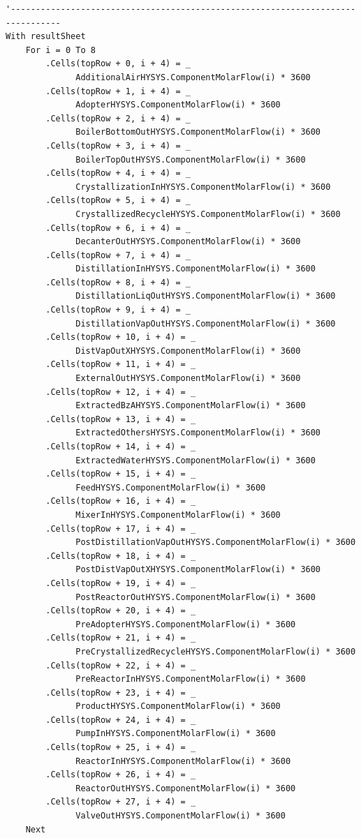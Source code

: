 \documentclass[a4j]{jsreport}
\begin{document}
\begin{lstlisting}[caption=HYSYSとpythonを繋ぐコード]
'--------------------------------------------------------------------------------
With resultSheet
    For i = 0 To 8
        .Cells(topRow + 0, i + 4) = _
              AdditionalAirHYSYS.ComponentMolarFlow(i) * 3600
        .Cells(topRow + 1, i + 4) = _
              AdopterHYSYS.ComponentMolarFlow(i) * 3600
        .Cells(topRow + 2, i + 4) = _
              BoilerBottomOutHYSYS.ComponentMolarFlow(i) * 3600
        .Cells(topRow + 3, i + 4) = _
              BoilerTopOutHYSYS.ComponentMolarFlow(i) * 3600
        .Cells(topRow + 4, i + 4) = _
              CrystallizationInHYSYS.ComponentMolarFlow(i) * 3600
        .Cells(topRow + 5, i + 4) = _
              CrystallizedRecycleHYSYS.ComponentMolarFlow(i) * 3600
        .Cells(topRow + 6, i + 4) = _
              DecanterOutHYSYS.ComponentMolarFlow(i) * 3600
        .Cells(topRow + 7, i + 4) = _
              DistillationInHYSYS.ComponentMolarFlow(i) * 3600
        .Cells(topRow + 8, i + 4) = _
              DistillationLiqOutHYSYS.ComponentMolarFlow(i) * 3600
        .Cells(topRow + 9, i + 4) = _
              DistillationVapOutHYSYS.ComponentMolarFlow(i) * 3600
        .Cells(topRow + 10, i + 4) = _
              DistVapOutXHYSYS.ComponentMolarFlow(i) * 3600
        .Cells(topRow + 11, i + 4) = _
              ExternalOutHYSYS.ComponentMolarFlow(i) * 3600
        .Cells(topRow + 12, i + 4) = _
              ExtractedBzAHYSYS.ComponentMolarFlow(i) * 3600
        .Cells(topRow + 13, i + 4) = _
              ExtractedOthersHYSYS.ComponentMolarFlow(i) * 3600
        .Cells(topRow + 14, i + 4) = _
              ExtractedWaterHYSYS.ComponentMolarFlow(i) * 3600
        .Cells(topRow + 15, i + 4) = _
              FeedHYSYS.ComponentMolarFlow(i) * 3600
        .Cells(topRow + 16, i + 4) = _
              MixerInHYSYS.ComponentMolarFlow(i) * 3600
        .Cells(topRow + 17, i + 4) = _
              PostDistillationVapOutHYSYS.ComponentMolarFlow(i) * 3600
        .Cells(topRow + 18, i + 4) = _
              PostDistVapOutXHYSYS.ComponentMolarFlow(i) * 3600
        .Cells(topRow + 19, i + 4) = _
              PostReactorOutHYSYS.ComponentMolarFlow(i) * 3600
        .Cells(topRow + 20, i + 4) = _
              PreAdopterHYSYS.ComponentMolarFlow(i) * 3600
        .Cells(topRow + 21, i + 4) = _
              PreCrystallizedRecycleHYSYS.ComponentMolarFlow(i) * 3600
        .Cells(topRow + 22, i + 4) = _
              PreReactorInHYSYS.ComponentMolarFlow(i) * 3600
        .Cells(topRow + 23, i + 4) = _
              ProductHYSYS.ComponentMolarFlow(i) * 3600
        .Cells(topRow + 24, i + 4) = _
              PumpInHYSYS.ComponentMolarFlow(i) * 3600
        .Cells(topRow + 25, i + 4) = _
              ReactorInHYSYS.ComponentMolarFlow(i) * 3600
        .Cells(topRow + 26, i + 4) = _
              ReactorOutHYSYS.ComponentMolarFlow(i) * 3600
        .Cells(topRow + 27, i + 4) = _
              ValveOutHYSYS.ComponentMolarFlow(i) * 3600
    Next


\end{lstlisting}
\end{document}
